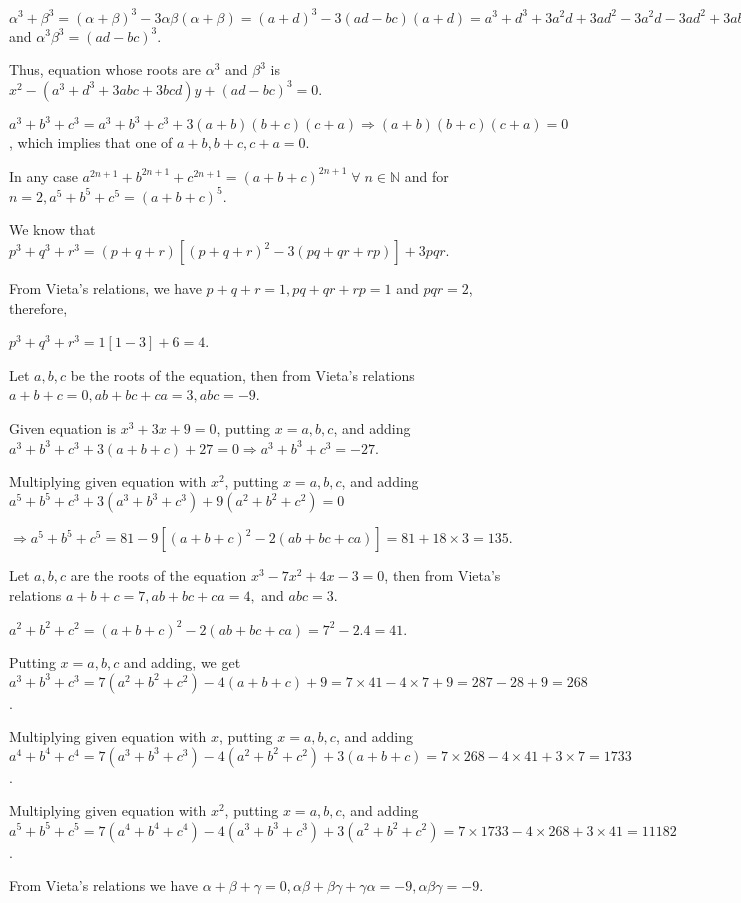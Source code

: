   $\alpha^3 + \beta^3 = (\alpha + \beta)^3 - 3\alpha\beta(\alpha + \beta) = (a + d)^3 - 3(ad - bc)(a + d) =
  a^3 + d^3 + 3a^2d + 3ad^2 - 3a^2d - 3ad^2 + 3abc + 3bcd = a^3 + b^3 + 3abc + 3bcd$ and $\alpha^3\beta^3 =
  (ad - bc)^3$.

  Thus, equation whose roots are $\alpha^3$ and $\beta^3$ is $x^2 - (a^3 + d^3 + 3abc + 3bcd)y + (ad - bc)^3
  = 0$.
\item $a^3 + b^3 + c^3 = a^3 + b^3 + c^3 + 3(a + b)(b + c)(c + a)\Rightarrow (a + b)(b + c)(c + a) = 0$,
  which implies that one of $a + b, b + c, c + a = 0$.

  In any case $a^{2n + 1} + b^{2n + 1} + c^{2n + 1} = (a + b + c)^{2n + 1}\;\forall\;n\in\mathbb{N}$ and for
  $n = 2, a^5 + b^5 + c^5 = (a + b + c)^5$.
\item We know that $p^3 + q^3 + r^3 = (p + q + r)[(p + q + r)^2 - 3(pq + qr + rp)] + 3pqr$.

  From Vieta's relations, we have $p + q + r = 1, pq + qr + rp = 1$ and $pqr = 2$, therefore,

  $p^3 + q^3 + r^3 = 1[1 - 3] + 6 = 4$.
\item Let $a, b, c$ be the roots of the equation, then from Vieta's relations $a + b + c = 0, ab + bc + ca =
  3, abc = -9$.

  Given equation is $x^3 + 3x + 9 = 0$, putting $x = a, b, c$, and adding $a^3 + b^3 + c^3 + 3(a + b + c) +
  27 = 0 \Rightarrow a^3 + b^3 + c^3 = -27$.

  Multiplying given equation with $x^2$, putting $x = a, b, c$, and adding $a^5 + b^5 + c^3 + 3(a^3 + b^3 +
  c^3) + 9(a^2 + b^2 + c^2) = 0$

  $\Rightarrow a^5 + b^5 + c^5 = 81 - 9[(a + b + c)^2 - 2(ab + bc + ca)] = 81 + 18\times 3 = 135$.
\item Let $a, b, c$ are the roots of the equation $x^3 - 7x^2 + 4x - 3 = 0$, then from Vieta's relations $a
  + b + c = 7, ab + bc + ca = 4,$ and $abc = 3$.

  $a^2 + b^2 + c^2 = (a + b + c)^2 - 2(ab + bc + ca) = 7^2 - 2.4 = 41$.

  Putting $x = a, b, c$ and adding, we get $a^3 + b^3 + c^3 = 7(a^2 + b^2 + c^2) - 4(a + b + c) + 9 =
  7\times41 - 4\times7 + 9 = 287 - 28 + 9 = 268$.

  Multiplying given equation with $x$, putting $x = a, b, c$, and adding $a^4 + b^4 + c^4 = 7(a^3 + b^3 +
  c^3) - 4(a^2 + b^2 + c^2) + 3(a + b + c) = 7\times268 - 4\times41 + 3\times7 = 1733$.

  Multiplying given equation with $x^2$, putting $x = a, b, c$, and adding $a^5 + b^5 + c^5 = 7(a^4 + b^4 +
  c^4) - 4(a^3 + b^3 + c^3) + 3(a^2 + b^2 + c^2) = 7\times1733 - 4\times268 + 3\times41 = 11182$.
\item From Vieta's relations we have $\alpha + \beta + \gamma = 0, \alpha\beta + \beta\gamma + \gamma\alpha
  = -9, \alpha\beta\gamma = -9$.

